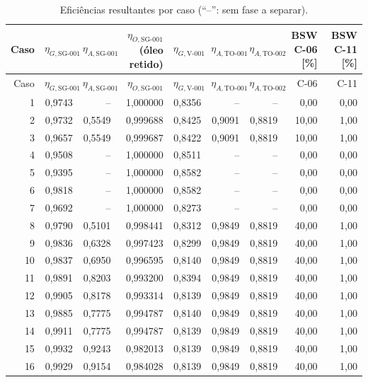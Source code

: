 \documentclass[11pt,a4paper]{article}
\numberwithin{equation}{section}
\numberwithin{table}{section}
\numberwithin{figure}{section}
\begin{document}
\begin{landscape}\small
\begin{longtable}{rrrrrrrrr}
\caption{Eficiências resultantes por caso (``--'': sem fase a separar).}\label{tab:eficcaso}\\\toprule
Caso & $\eta_{G,\mbox{SG-001}}$ & $\eta_{A,\mbox{SG-001}}$ & $\eta_{O,\mbox{SG-001}}$ (óleo retido) & $\eta_{G,\mbox{V-001}}$ & $\eta_{A,\mbox{TO-001}}$ & $\eta_{A,\mbox{TO-002}}$ & BSW C-06 [\%] & BSW C-11 [\%]\\\midrule\endfirsthead
\toprule Caso & $\eta_{G,\mbox{SG-001}}$ & $\eta_{A,\mbox{SG-001}}$ & $\eta_{O,\mbox{SG-001}}$ & $\eta_{G,\mbox{V-001}}$ & $\eta_{A,\mbox{TO-001}}$ & $\eta_{A,\mbox{TO-002}}$ & C-06 & C-11\\\midrule\endhead

1 & 0,9743 & -- & 1,000000 & 0,8356 & -- & -- & 0,00 & 0,00\\
2 & 0,9732 & 0,5549 & 0,999688 & 0,8425 & 0,9091 & 0,8819 & 10,00 & 1,00\\
3 & 0,9657 & 0,5549 & 0,999687 & 0,8422 & 0,9091 & 0,8819 & 10,00 & 1,00\\
4 & 0,9508 & -- & 1,000000 & 0,8511 & -- & -- & 0,00 & 0,00\\
5 & 0,9395 & -- & 1,000000 & 0,8582 & -- & -- & 0,00 & 0,00\\
6 & 0,9818 & -- & 1,000000 & 0,8582 & -- & -- & 0,00 & 0,00\\
7 & 0,9692 & -- & 1,000000 & 0,8273 & -- & -- & 0,00 & 0,00\\
8 & 0,9790 & 0,5101 & 0,998441 & 0,8312 & 0,9849 & 0,8819 & 40,00 & 1,00\\
9 & 0,9836 & 0,6328 & 0,997423 & 0,8299 & 0,9849 & 0,8819 & 40,00 & 1,00\\
10 & 0,9837 & 0,6950 & 0,996595 & 0,8140 & 0,9849 & 0,8819 & 40,00 & 1,00\\
11 & 0,9891 & 0,8203 & 0,993200 & 0,8394 & 0,9849 & 0,8819 & 40,00 & 1,00\\
12 & 0,9905 & 0,8178 & 0,993314 & 0,8139 & 0,9849 & 0,8819 & 40,00 & 1,00\\
13 & 0,9885 & 0,7775 & 0,994787 & 0,8140 & 0,9849 & 0,8819 & 40,00 & 1,00\\
14 & 0,9911 & 0,7775 & 0,994787 & 0,8139 & 0,9849 & 0,8819 & 40,00 & 1,00\\
15 & 0,9932 & 0,9243 & 0,982013 & 0,8139 & 0,9849 & 0,8819 & 40,00 & 1,00\\
16 & 0,9929 & 0,9154 & 0,984028 & 0,8139 & 0,9849 & 0,8819 & 40,00 & 1,00\\
\bottomrule\end{longtable}
\end{landscape}
\end{document}
